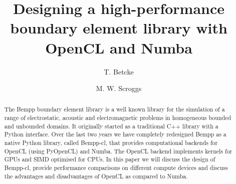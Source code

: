 \documentclass{IEEEcsmag}
\begin{document}

\title{Designing a high-performance boundary element library with OpenCL and Numba}

\author{T. Betcke}

\author{M. W. Scroggs}


\begin{abstract}
The Bempp boundary element library is a well known library for the simulation of a range of electrostatic, acoustic and electromagnetic problems in homogeneous bounded and unbounded domains. It originally started as a traditional C++ library with a Python interface. Over the last two years we have completely redesigned Bempp as a native Python library, called Bempp-cl, that provides computational backends for OpenCL (using PyOpenCL) and Numba. The OpenCL backend implements kernels for GPUs and SIMD optimised for CPUs. In this paper we will discuss the design of Bempp-cl, provide performance comparisons on different compute devices and discuss the advantages and disadvantages of OpenCL as compared to Numba.
\end{abstract}

\maketitle






\printbibliography
\end{document}
